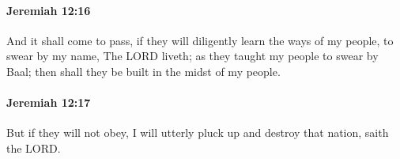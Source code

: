 		\paragraph{Jeremiah 12:16} %
			\label{JEREMIAH-12-16}

			And it shall come to pass, if they will diligently learn the ways of my people, to swear by my name, The LORD liveth; as they taught my people to swear by Baal; then shall they be built in the midst of my people.


		\paragraph{Jeremiah 12:17} %
			\label{JEREMIAH-12-17}

			But if they will not obey, I will utterly pluck up and destroy that nation, saith the LORD.

